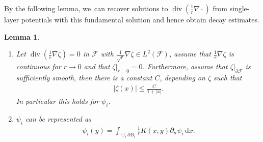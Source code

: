 \documentclass[10pt]{amsart}
\newcommand{\skpt}{\par\smallskip\noindent}
\newtheorem{lemma}[theorem]{Lemma}
\theoremstyle{definition}
\renewcommand{\div}{\operatorname{div}}
\newcommand\eq{=}
\newcommand\dd{\,\mathrm{d}}
\newcommand\dx{\dd x}
\let\de\partial
\begin{document}
By the following lemma, we~can recover solutions to $\div(\frac{1}{r}\nabla\cdot)$ from single-layer potentials with this fundamental solution and hence obtain decay estimates.

\skpt
\begin{lemma}\label{rep psi}
\begin{enumerate}
\item\label{rep psia}
Let $\div(\frac{1}{r}\nabla\zeta)=0$ in $\mathcal{F}$ with $\frac{1}{\sqrt{r}}\nabla\zeta\in L^2(\mathcal{F})$, assume that $\frac{1}{r}\nabla\zeta$ is continuous for $r\to 0$ and that $\zeta|_{r=0}=0$. Furthermore, assume that $\zeta|_{\de\mathcal{F}}$ is sufficiently smooth, then there is a constant $C$, depending on $\zeta$ such that
\begin{align*}
|\zeta(x)|\leq \frac{C}{1+|x|}.
\end{align*}
In particular this holds for $\psi_i$.
\item\label{rep psib}
$\psi_i$ can be represented as
\begin{align*}
\psi_i(y)\eq\int_{\cup_i\de B_i}\frac{1}{r}K(x,y)\de_n\psi_i\dx.
\end{align*}
\end{enumerate}
\end{lemma}
\end{document}
